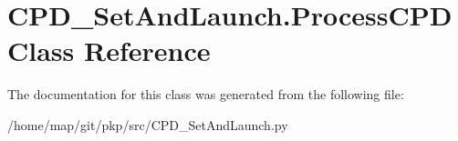\hypertarget{classCPD__SetAndLaunch_1_1ProcessCPD}{\section{\-C\-P\-D\-\_\-\-Set\-And\-Launch.\-Process\-C\-P\-D \-Class \-Reference}
\label{classCPD__SetAndLaunch_1_1ProcessCPD}
}


\-The documentation for this class was generated from the following file\-:\begin{DoxyCompactItemize}
\item 
/home/map/git/pkp/src/\-C\-P\-D\-\_\-\-Set\-And\-Launch.\-py\end{DoxyCompactItemize}

